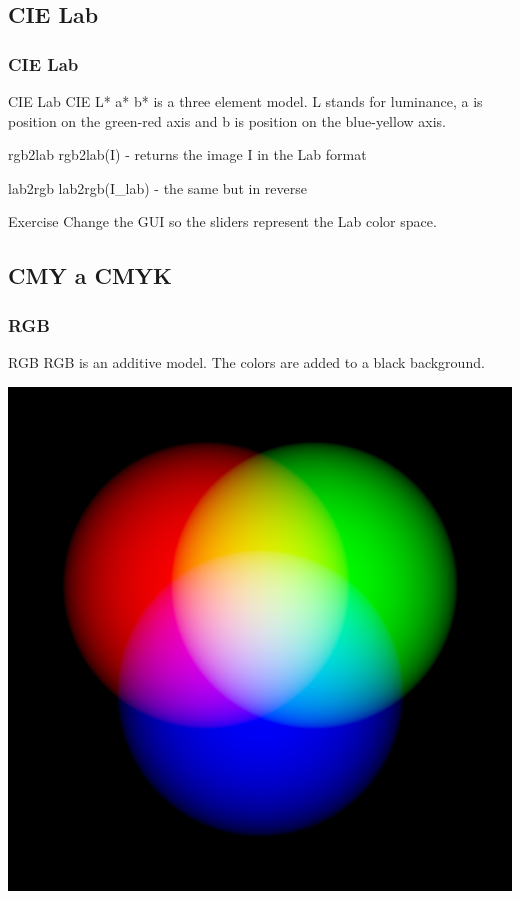 \documentclass{beamer}
\begin{document}
\subsection{CIE Lab}
\begin{frame}
\frametitle{CIE Lab}
  \begin{block}{CIE Lab}  
  CIE L* a* b* is a three element model. L stands for luminance, a is position on the green-red axis and b is position on the blue-yellow axis.
  \end{block} 

  
  \begin{block}{rgb2lab}
  rgb2lab(I) - returns the image I in the Lab format
  \end{block} 
  
    
  \begin{block}{lab2rgb}
  lab2rgb(I\_lab) - the same but in reverse
  \end{block} 

  
  \begin{block}{Exercise}
  Change the GUI so the sliders represent the Lab color space.
  \end{block} 
\end{frame}

\subsection{CMY a CMYK}

\begin{frame}
\frametitle{RGB}
  \begin{block}{RGB}
  RGB is an additive model. The colors are added to a black background.
  \end{block} 

  \begin{center}
  \includegraphics[height=0.5\textheight]{RGB.png}
  \end{center}
\end{frame}
\end{document}
